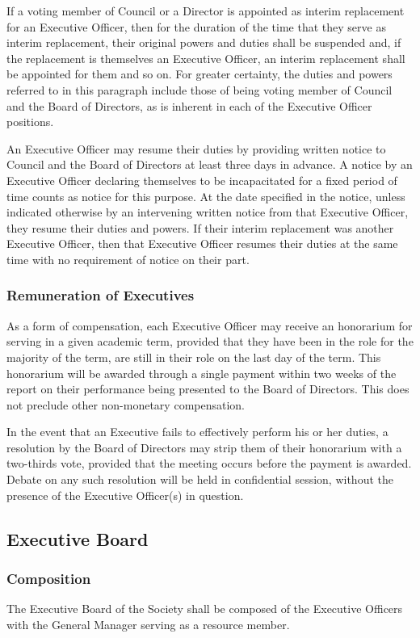 If a voting member of Council or a Director is appointed as interim replacement
for an Executive Officer, then for the duration of the time that they serve as
interim replacement, their original powers and duties shall be suspended and,
if the replacement is themselves an Executive Officer, an interim replacement
shall be appointed for them and so on. For greater certainty, the duties and
powers referred to in this paragraph include those of being voting member of
Council and the Board of Directors, as is inherent in each of the Executive
Officer positions.

An Executive Officer may resume their duties by providing written notice to
Council and the Board of Directors at least three days in advance. A
notice by an Executive Officer declaring themselves to be incapacitated for a
fixed period of time counts as notice for this purpose. At the date specified
in the notice, unless indicated otherwise by an intervening written notice from
that Executive Officer, they resume their duties and powers. If their interim
replacement was another Executive Officer, then that Executive Officer resumes
their duties at the same time with no requirement of notice on their part.

\subsubsection{Remuneration of Executives}
As a form of compensation, each Executive Officer may receive an honorarium
for serving in a given academic term, provided that they have been in the role
for the majority of the term, are still in their role on the last day of the
term. This honorarium will be awarded through a single payment within
two weeks of the report on their performance being presented to the Board
of Directors. This does not preclude other non-monetary compensation. 

In the event that an Executive fails to effectively perform his or her duties,
a resolution by the Board of Directors may strip them of their
honorarium with a two-thirds vote, provided that the meeting occurs before the
payment is awarded. Debate on any such resolution will be held in confidential
session, without the presence of the Executive Officer(s) in question.

\subsection{Executive Board}

\subsubsection{Composition}
The Executive Board of the Society shall be composed of the Executive Officers
with the General Manager serving as a resource member.

